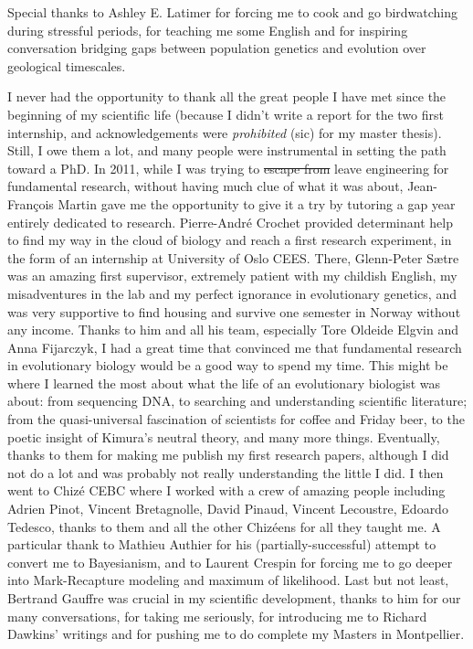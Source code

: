 Special thanks to Ashley E. Latimer for forcing me to cook and go birdwatching during stressful periods, for teaching me some English and for inspiring conversation bridging gaps between population genetics and evolution over geological timescales. 

I never had the opportunity to thank all the great people I have met since the beginning of my scientific life (because I didn't write a report for the two first internship, and acknowledgements were \textit{prohibited} (sic) for my master thesis). Still, I owe them a lot, and many people were instrumental in setting the path toward a PhD. 
In 2011, while I was trying to \sout{escape from} leave engineering for fundamental research, without having much clue of what it was about, Jean-Fran\c{c}ois Martin gave me the opportunity to give it a try by tutoring a gap year entirely dedicated to research. Pierre-Andr\'{e} Crochet provided determinant help to find my way in the cloud of biology and reach a first research experiment, in the form of an internship at University of Oslo CEES. There, Glenn-Peter S{\ae}tre was an amazing first supervisor, extremely patient with my childish English, my misadventures in the lab and my perfect ignorance in evolutionary genetics, and was very supportive to find housing and survive one semester in Norway without any income. Thanks to him and all his team, especially Tore Oldeide Elgvin and Anna Fijarczyk, I had a great time that convinced me that fundamental research in evolutionary biology would be a good way to spend my time. This might be where I learned the most about what the life of an evolutionary biologist was about: from sequencing DNA, to searching and understanding scientific literature; from the quasi-universal fascination of scientists for coffee and Friday beer, to the poetic insight of Kimura's neutral theory, and many more things. Eventually, thanks to them for making me publish my first research papers, although I did not do a lot and was probably not really understanding the little I did. 
I then went to Chiz\'{e} CEBC where I worked with a crew of amazing people including Adrien Pinot, Vincent Bretagnolle, David Pinaud, Vincent Lecoustre, Edoardo Tedesco, thanks to them and all the other Chiz\'eens for all they taught me. A particular thank to Mathieu Authier for his (partially-successful) attempt to convert me to Bayesianism, and to Laurent Crespin for forcing me to go deeper into Mark-Recapture modeling and maximum of likelihood. Last but not least, Bertrand Gauffre was crucial in my scientific development, thanks to him for our many conversations, for taking me seriously, for introducing me to Richard Dawkins' writings and for pushing me to do complete my Masters in Montpellier. 
